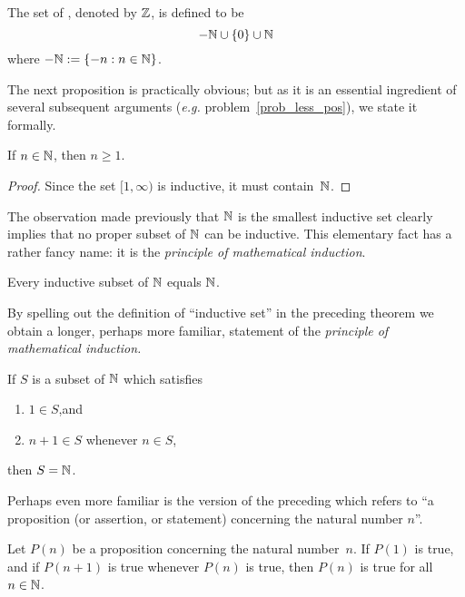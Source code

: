 \begin{defn} The set of
, denoted by $\mathbb{Z}$, is defined to be
  \[ -\mathbb{N} \cup \{0\} \cup \mathbb{N} \]
where $-\mathbb{N} := \{-n: n \in \mathbb{N}\}$.
\end{defn}

The next proposition is practically obvious; but as it is an essential ingredient of several
subsequent arguments (\emph{e.g.} problem~\ref{prob_less_pos}), we state it formally.

\begin{prop}\label{prop_natno_pos} If $n \in \mathbb{N}$, then $n \ge 1$.
\end{prop}

\begin{proof}  Since the set $[1,\infty)$ is inductive, it must contain~$\mathbb{N}$.
\end{proof}

The observation made previously that $\mathbb{N}$ is the smallest inductive set clearly implies that
no proper subset of $\mathbb{N}$ can be inductive. This elementary fact has a rather fancy name: it is
the \emph{principle of mathematical induction}.

\begin{thm}\label{thm_mth_ind}
Every inductive subset of $\mathbb{N}$ equals $\mathbb{N}$.
\end{thm}

By spelling out the definition of ``inductive set'' in the preceding theorem we obtain a
longer, perhaps more familiar, statement of the \emph{principle of mathematical induction.}

\begin{cor}\label{cor_mi2}  If $S$ is a subset of $\mathbb{N}$ which satisfies
 \begin{enumerate}
  \item $1 \in S$,\quad and
  \item $n + 1 \in S$ whenever $n \in S$,
 \end{enumerate}
then $S = \mathbb{N}$.
\end{cor}

Perhaps even more familiar is the version of the preceding which refers to ``a proposition (or
assertion, or statement) concerning the natural number $n$''.

\begin{cor}\label{cor_mi3}  Let $P(n)$ be a proposition concerning the natural number~$n$.  If
$P(1)$ is true, and if $P(n + 1)$ is true whenever $P(n)$ is true, then $P(n)$ is true for all
$n \in \mathbb{N}$.
\end{cor}

